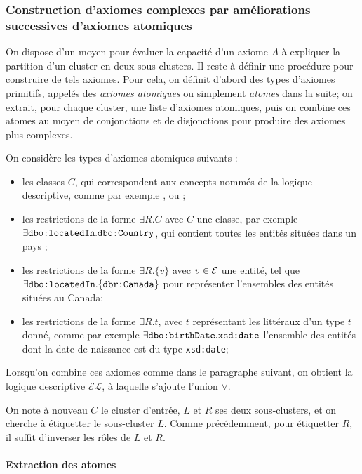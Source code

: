 \subsubsection{Construction d'axiomes complexes par améliorations successives d'axiomes atomiques}

On dispose d'un moyen pour évaluer la capacité d'un axiome $A$ à expliquer la partition d'un cluster en deux sous-clusters. Il reste à définir une procédure pour construire de tels axiomes. Pour cela, on définit d'abord des types d'axiomes primitifs, appelés des \textit{axiomes atomiques} ou simplement \textit{atomes} dans la suite; on extrait, pour chaque cluster, une liste d'axiomes atomiques, puis on combine ces atomes au moyen de conjonctions et de disjonctions pour produire des axiomes plus complexes.

On considère les types d'axiomes atomiques suivants :
\begin{itemize}
    \item les classes $C$, qui correspondent aux concepts nommés de la logique descriptive, comme par exemple ,  ou ;
    \item les restrictions de la forme $\exists R.C$ avec $C$ une classe, par exemple $\exists \texttt{dbo:locatedIn}.\texttt{dbo:Country}$, qui contient toutes les entités situées dans un pays ;
    \item les restrictions de la forme $\exists R.\{v\}$ avec $v \in \mathcal{E}$ une entité, tel que $\exists \texttt{dbo:locatedIn}.\{\texttt{dbr:Canada}\}$ pour représenter l'ensembles des entités situées au Canada;
    \item les restrictions de la forme $\exists R.t$, avec $t$ représentant les littéraux d'un type $t$ donné, comme par exemple $\exists \texttt{dbo:birthDate}.\texttt{xsd:date}$ l'ensemble des entités dont la date de naissance est du type \texttt{xsd:date};
\end{itemize}
Lorsqu'on combine ces axiomes comme dans le paragraphe suivant, on obtient la logique descriptive $\mathcal{EL}$, à laquelle s'ajoute l'union $\lor$.

On note à nouveau $C$ le cluster d'entrée,  $L$ et $R$ ses deux sous-clusters, et on cherche à étiquetter le sous-cluster $L$. Comme précédemment, pour étiquetter $R$, il suffit d'inverser les rôles de $L$ et $R$.

\paragraph{Extraction des atomes}

